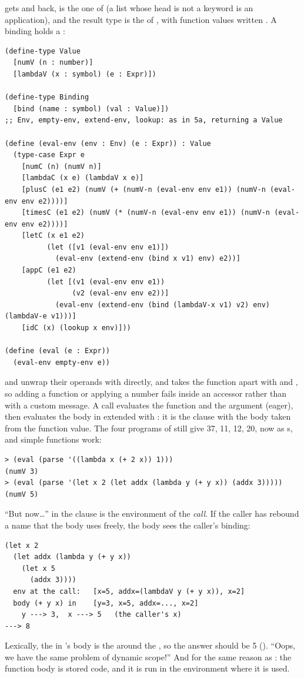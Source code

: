  gets  and  back,  is the one of  (a list whose head is not a keyword is an application), and the result type is the  of , with function values written . A binding holds a :
\begin{lstlisting}
(define-type Value
  [numV (n : number)]
  [lambdaV (x : symbol) (e : Expr)])

(define-type Binding
  [bind (name : symbol) (val : Value)])
;; Env, empty-env, extend-env, lookup: as in 5a, returning a Value

(define (eval-env (env : Env) (e : Expr)) : Value
  (type-case Expr e
    [numC (n) (numV n)]
    [lambdaC (x e) (lambdaV x e)]
    [plusC (e1 e2) (numV (+ (numV-n (eval-env env e1)) (numV-n (eval-env env e2))))]
    [timesC (e1 e2) (numV (* (numV-n (eval-env env e1)) (numV-n (eval-env env e2))))]
    [letC (x e1 e2)
          (let ([v1 (eval-env env e1)])
            (eval-env (extend-env (bind x v1) env) e2))]
    [appC (e1 e2)
          (let [(v1 (eval-env env e1))
                (v2 (eval-env env e2))]
            (eval-env (extend-env (bind (lambdaV-x v1) v2) env) (lambdaV-e v1)))]
    [idC (x) (lookup x env)]))

(define (eval (e : Expr))
  (eval-env empty-env e))
\end{lstlisting}
\code{+} and \code{*} unwrap their operands with  directly, and  takes the function apart with  and , so adding a function or applying a number fails inside an accessor rather than with a custom message. A call evaluates the function and the argument (eager), then evaluates the body in  extended with : it is the  clause with the body taken from the function value. The four  programs of  still give 37, 11, 12, 20, now as s, and simple functions work:
\begin{lstlisting}[style=repl]
> (eval (parse '((lambda x (+ 2 x)) 1)))
(numV 3)
> (eval (parse '(let x 2 (let addx (lambda y (+ y x)) (addx 3)))))
(numV 5)
\end{lstlisting}
``But now\ldots''  in the  clause is the environment of the \emph{call}. If the caller has rebound a name that the body uses freely, the body sees the caller's binding:
\begin{lstlisting}[style=repl]
(let x 2
  (let addx (lambda y (+ y x))
    (let x 5
      (addx 3))))
  env at the call:   [x=5, addx=(lambdaV y (+ y x)), x=2]
  body (+ y x) in    [y=3, x=5, addx=..., x=2]
    y ---> 3,  x ---> 5   (the caller's x)
---> 8
\end{lstlisting}
Lexically, the  in 's body is the  around the , so the answer should be 5 (). ``Oops, we have the same problem of dynamic scope!'' And for the same reason as : the function body is stored code, and it is run in the environment where it is used.

